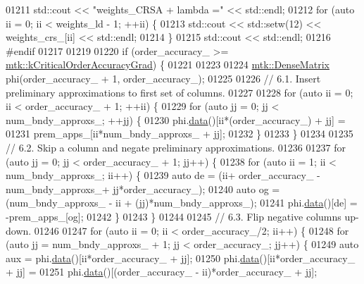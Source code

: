 \begin{DoxyCode}
{{01211   std::cout << \textcolor{stringliteral}{"weights\_CRSA + lambda ="} << std::endl;
01212   \textcolor{keywordflow}{for} (\textcolor{keyword}{auto} ii = 0; ii < weights\_ld - 1; ++ii) \{
01213     std::cout << std::setw(12) << weights\_crs\_[ii] << std::endl;
01214   \}
01215   std::cout << std::endl;
01216 \textcolor{preprocessor}{  #endif}
01217 
01219 
01220   \textcolor{keywordflow}{if} (order\_accuracy\_ >= \hyperlink{group__c01-roots_ga295dd2f403c775ecd942c22b5a777496}{mtk::kCriticalOrderAccuracyGrad}) \{
01221 
01223 
01224     \hyperlink{classmtk_1_1DenseMatrix}{mtk::DenseMatrix} phi(order\_accuracy\_ + 1, order\_accuracy\_);
01225 
01226     \textcolor{comment}{// 6.1. Insert preliminary approximations to first set of columns.}
01227 
01228     \textcolor{keywordflow}{for} (\textcolor{keyword}{auto} ii = 0; ii < order\_accuracy\_ + 1; ++ii) \{
01229       \textcolor{keywordflow}{for} (\textcolor{keyword}{auto} jj = 0; jj < num\_bndy\_approxs\_; ++jj) \{
01230         phi.\hyperlink{classmtk_1_1DenseMatrix_a0c33b8a9e01d157c61ddbdf807c25d84}{data}()[ii*(order\_accuracy\_) + jj] =
01231           prem\_apps\_[ii*num\_bndy\_approxs\_ + jj];
01232       \}
01233     \}
01234 
01235     \textcolor{comment}{// 6.2. Skip a column and negate preliminary approximations.}
01236 
01237     \textcolor{keywordflow}{for} (\textcolor{keyword}{auto} jj = 0; jj < order\_accuracy\_ + 1; jj++) \{
01238       \textcolor{keywordflow}{for} (\textcolor{keyword}{auto} ii = 1; ii < num\_bndy\_approxs\_; ii++) \{
01239         \textcolor{keyword}{auto} de = (ii+ order\_accuracy\_ - num\_bndy\_approxs\_+ jj*order\_accuracy\_);
01240         \textcolor{keyword}{auto} og = (num\_bndy\_approxs\_ - ii + (jj)*num\_bndy\_approxs\_);
01241         phi.\hyperlink{classmtk_1_1DenseMatrix_a0c33b8a9e01d157c61ddbdf807c25d84}{data}()[de] = -prem\_apps\_[og];
01242       \}
01243     \}
01244 
01245     \textcolor{comment}{// 6.3. Flip negative columns up-down.}
01246 
01247     \textcolor{keywordflow}{for} (\textcolor{keyword}{auto} ii = 0; ii < order\_accuracy\_/2; ii++) \{
01248       \textcolor{keywordflow}{for} (\textcolor{keyword}{auto} jj = num\_bndy\_approxs\_ + 1; jj < order\_accuracy\_; jj++) \{
01249         \textcolor{keyword}{auto} aux = phi.\hyperlink{classmtk_1_1DenseMatrix_a0c33b8a9e01d157c61ddbdf807c25d84}{data}()[ii*order\_accuracy\_ + jj];
01250         phi.\hyperlink{classmtk_1_1DenseMatrix_a0c33b8a9e01d157c61ddbdf807c25d84}{data}()[ii*order\_accuracy\_ + jj] =
01251           phi.\hyperlink{classmtk_1_1DenseMatrix_a0c33b8a9e01d157c61ddbdf807c25d84}{data}()[(order\_accuracy\_ - ii)*order\_accuracy\_ + jj];
}}
\end{DoxyCode}
